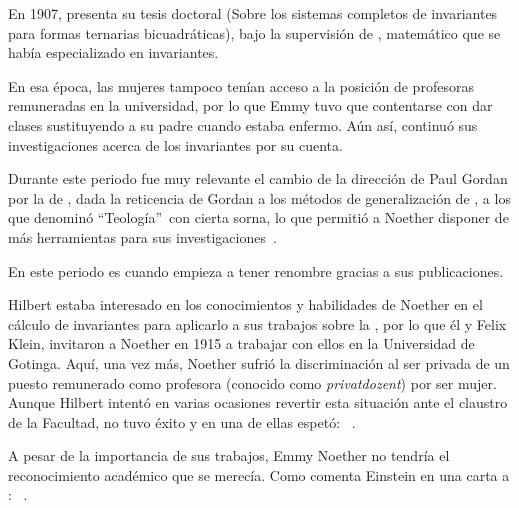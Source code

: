 En 1907, presenta su tesis doctoral  (Sobre los sistemas completos de invariantes para formas ternarias bicuadráticas), bajo la supervisión de , matemático que se había especializado en invariantes.

En esa época, las mujeres tampoco tenían acceso a la posición de profesoras remuneradas en la universidad, por lo que Emmy tuvo que contentarse con dar clases sustituyendo a su padre cuando estaba enfermo.
Aún así, continuó sus investigaciones acerca de los invariantes por su cuenta.

Durante este periodo fue muy relevante el cambio de la dirección de Paul Gordan por la de , dada la reticencia de Gordan a los métodos de generalización de , a los que denominó \textquotedblleft Teología\textquotedblright\ con cierta sorna, lo que permitió a Noether disponer de más herramientas para sus investigaciones~\cite{Weyl}.

En este periodo es cuando empieza a tener renombre gracias a sus publicaciones.

Hilbert estaba interesado en los conocimientos y habilidades de Noether en el cálculo de invariantes para aplicarlo a sus trabajos sobre la ,
por lo que él y Felix Klein, invitaron a Noether en 1915 a trabajar con ellos en la Universidad de Gotinga.
Aquí, una vez más, Noether sufrió la discriminación al ser privada de un puesto remunerado como profesora (conocido como \textit{privatdozent}) por ser mujer.
Aunque Hilbert intentó en varias ocasiones revertir esta situación ante el claustro de la Facultad, no tuvo éxito y en una de ellas espetó: ~\cite[332]{Carrasco}.

A pesar de la importancia de sus trabajos, Emmy Noether no tendría el reconocimiento académico que se merecía.
Como comenta Einstein en una carta a : ~\cite{Kimberling}.

